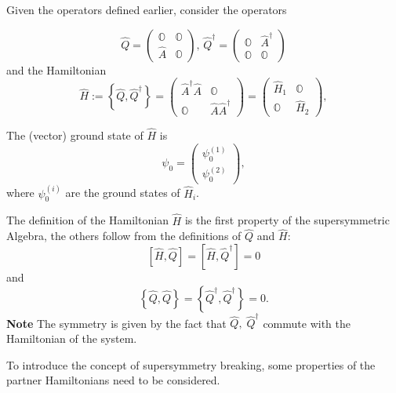 Given the operators defined earlier, consider the operators

\begin{equation*}
\hat Q = \begin{pmatrix}
    \mathbb{O}&\mathbb{O}\\
    \hat A&\mathbb{O}
\end{pmatrix}\text{,   }
\hat Q^\dagger = \begin{pmatrix}
    \mathbb{O}&\hat A^\dagger\\
    \mathbb{O}&\mathbb{O}
\end{pmatrix}
\label{eq:alg_1}
\end{equation*}
and the Hamiltonian
\begin{equation*}
\hat H := \left\{\hat Q,\hat Q^\dagger\right\}= 
\begin{pmatrix}
    \hat A^\dagger\hat A& \mathbb{O}\\
    \mathbb{O}&\hat A\hat A^\dagger
\end{pmatrix} =
\begin{pmatrix}
    \hat H_1& \mathbb{O}\\
    \mathbb{O}&\hat H_2
\end{pmatrix},
\end{equation*}

The (vector) ground state of $\hat H$ is
$$\psi_0=\begin{pmatrix}
\psi^{(1)}_0\\
\psi^{(2)}_0
\end{pmatrix},
$$
where $\psi^{(i)}_0$ are the ground states of $\hat H_i$.

The definition of the Hamiltonian $\hat H$ is the first property of the
supersymmetric Algebra, the others follow from the definitions of $\hat Q$ and
$\hat H$:
\begin{equation*}
\left[\hat H, \hat Q\right]= \left[\hat H, \hat Q^\dagger\right]=0
\end{equation*}
and 
\begin{equation*}
\left\{\hat Q,\hat Q\right\}=\left\{\hat Q^\dagger,\hat Q^\dagger\right\}=0.
\label{eq:alg_2}
\end{equation*}
\textbf{Note} The symmetry is given by the fact that $\hat Q,\; \hat Q^\dagger$
commute with the Hamiltonian of the system.

To introduce the concept of supersymmetry breaking, some properties of the
partner Hamiltonians need to be considered.


